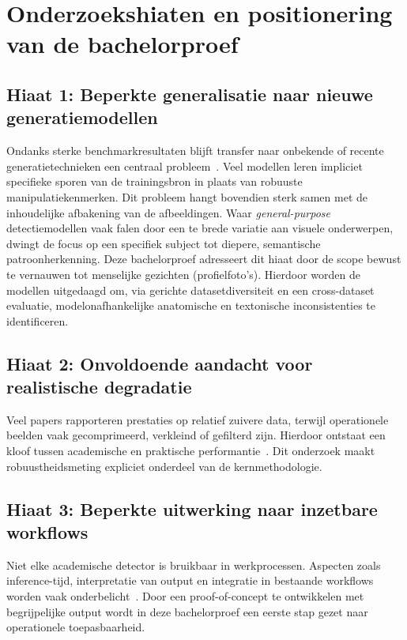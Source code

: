 \section{Onderzoekshiaten en positionering van de bachelorproef}

\subsection{Hiaat 1: Beperkte generalisatie naar nieuwe generatiemodellen}
Ondanks sterke benchmarkresultaten blijft transfer naar onbekende of recente generatietechnieken een centraal probleem~\autocite{Hasan2026,Pei2024}. Veel modellen leren impliciet specifieke sporen van de trainingsbron in plaats van robuuste manipulatiekenmerken. Dit probleem hangt bovendien sterk samen met de inhoudelijke afbakening van de afbeeldingen. Waar \emph{general-purpose} detectiemodellen vaak falen door een te brede variatie aan visuele onderwerpen, dwingt de focus op een specifiek subject tot diepere, semantische patroonherkenning. Deze bachelorproef adresseert dit hiaat door de scope bewust te vernauwen tot menselijke gezichten (profielfoto's). Hierdoor worden de modellen uitgedaagd om, via gerichte datasetdiversiteit en een cross-dataset evaluatie, modelonafhankelijke anatomische en textonische inconsistenties te identificeren.

\subsection{Hiaat 2: Onvoldoende aandacht voor realistische degradatie}
Veel papers rapporteren prestaties op relatief zuivere data, terwijl operationele beelden vaak gecomprimeerd, verkleind of gefilterd zijn. Hierdoor ontstaat een kloof tussen academische en praktische performantie~\autocite{CompressionHybrid2025,EvaluationModels2025}. Dit onderzoek maakt robuustheidsmeting expliciet onderdeel van de kernmethodologie.

\subsection{Hiaat 3: Beperkte uitwerking naar inzetbare workflows}
Niet elke academische detector is bruikbaar in werkprocessen. Aspecten zoals inference-tijd, interpretatie van output en integratie in bestaande workflows worden vaak onderbelicht~\autocite{Raza2026,SIDA2025}. Door een proof-of-concept te ontwikkelen met begrijpelijke output wordt in deze bachelorproef een eerste stap gezet naar operationele toepasbaarheid.

